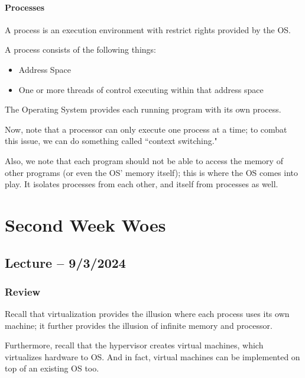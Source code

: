\documentclass[openany]{book}
\begin{document}
\subsubsection{Processes}
\begin{defn}[Process]
	A process is an execution environment with restrict rights provided by the OS.
\end{defn}

A process consists of the following things:
\begin{itemize}
	\item Address Space
	\item One or more threads of control executing within that address space
\end{itemize}

The Operating System provides each running program with its own process.

Now, note that a processor can only execute one process at a time; to combat this issue, we can do something called ``context switching."

Also, we note that each program should not be able to access the memory of other programs (or even the OS' memory itself); this is where the OS comes into play. It isolates processes from each other, and itself from processes as well.

\chapter{Second Week Woes}
\section{Lecture -- 9/3/2024}
\subsection{Review}
Recall that virtualization provides the illusion where each process uses its own machine; it further provides the illusion of infinite memory and processor.

Furthermore, recall that the hypervisor creates virtual machines, which virtualizes hardware to OS. And in fact, virtual machines can be implemented on top of an existing OS too.
\end{document}
